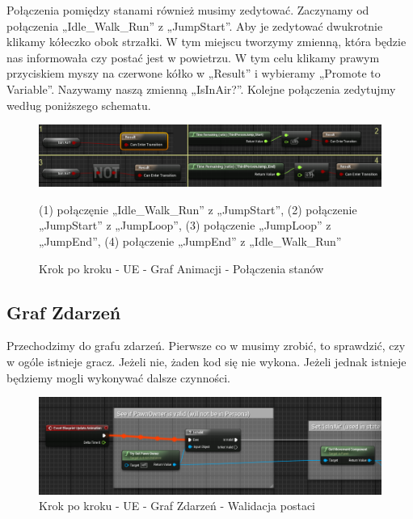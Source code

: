 \documentclass[openright]{xmgr}
\begin{document}
Połączenia pomiędzy stanami również musimy zedytować. Zaczynamy od połączenia „Idle\_Walk\_Run” z „JumpStart”. Aby je zedytować dwukrotnie klikamy kółeczko obok strzałki. W tym miejscu tworzymy zmienną, która będzie nas informowała czy postać jest w powietrzu. W tym celu klikamy prawym przyciskiem myszy na czerwone kółko w „Result” i wybieramy „Promote to Variable”. Nazywamy naszą zmienną „IsInAir?”. Kolejne połączenia zedytujmy według poniższego schematu.
\newpage
\begin{figure}[!htb]
    \begin{center}
    \includegraphics[scale=0.5]{Screeny/UeKrokPoKroku/UE-AnimGraph-Connect.png}
    \end{center}
    \caption{Krok po kroku - UE -  Graf Animacji - Połączenia stanów}
 (1) połączęnie „Idle\_Walk\_Run” z „JumpStart”, (2) połączenie „JumpStart” z „JumpLoop”, (3) połączenie „JumpLoop” z „JumpEnd”, (4) połączenie „JumpEnd” z „Idle\_Walk\_Run”
\end{figure}

\subsection{Graf Zdarzeń}
Przechodzimy do grafu zdarzeń. Pierwsze co w musimy zrobić, to sprawdzić, czy w ogóle istnieje gracz. Jeżeli nie, żaden kod się nie wykona. Jeżeli jednak istnieje będziemy mogli wykonywać dalsze czynności.

\begin{figure}[!htb]
    \begin{center}
    \includegraphics[scale=0.6]{Screeny/UeKrokPoKroku/UE-EventGraph-IsValid.png}
    \end{center}
    \caption{Krok po kroku - UE -  Graf Zdarzeń - Walidacja postaci}
\end{figure}
\end{document}
